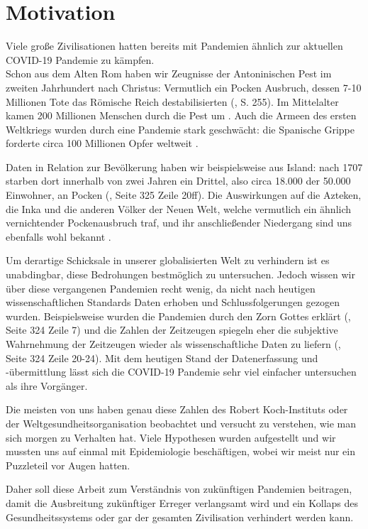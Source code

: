 \chapter{Motivation}\label{chap:Motivation}
Viele große Zivilisationen hatten bereits mit Pandemien ähnlich zur aktuellen COVID-19 Pandemie zu kämpfen.\\
Schon aus dem Alten Rom haben wir Zeugnisse der Antoninischen Pest im zweiten Jahrhundert nach Christus: Vermutlich ein Pocken Ausbruch, dessen 7-10 Millionen Tote das Römische Reich destabilisierten (\autocite{RomPest}, S. 255).
Im Mittelalter kamen 200 Millionen Menschen durch die Pest um \autocite{PestMittelalter}.
Auch die Armeen des ersten Weltkriegs wurden durch eine Pandemie stark geschwächt: die Spanische Grippe forderte circa 100 Millionen Opfer weltweit \autocite{SpanischeGrippe}.

Daten in Relation zur Bevölkerung haben wir beispielsweise aus Island: nach 1707 starben dort innerhalb von zwei Jahren ein Drittel, also circa  18.000 der 50.000 Einwohner, an Pocken (\autocite{americaPandemics}, Seite 325 Zeile 20ff). Die Auswirkungen auf die Azteken, die Inka und die anderen Völker der Neuen Welt, welche vermutlich ein ähnlich vernichtender Pockenausbruch traf, und ihr anschließender Niedergang sind uns ebenfalls wohl bekannt \autocite{americaPandemics}.

Um derartige Schicksale in unserer globalisierten Welt zu verhindern ist es unabdingbar, diese Bedrohungen bestmöglich zu untersuchen.
Jedoch wissen wir über diese vergangenen Pandemien recht wenig, da nicht nach heutigen wissenschaftlichen Standards Daten erhoben und Schlussfolgerungen gezogen wurden. Beispielsweise wurden die Pandemien durch den Zorn Gottes erklärt (\autocite{americaPandemics}, Seite 324 Zeile 7) und die Zahlen der Zeitzeugen spiegeln eher die subjektive Wahrnehmung der Zeitzeugen wieder als wissenschaftliche Daten zu liefern (\autocite{americaPandemics}, Seite 324 Zeile 20-24). Mit dem heutigen Stand der Datenerfassung und -übermittlung lässt sich die COVID-19 Pandemie sehr viel einfacher untersuchen als ihre Vorgänger.

Die meisten von uns haben genau diese Zahlen des Robert Koch-Instituts oder der Weltgesundheitsorganisation beobachtet und versucht zu verstehen, wie man sich morgen zu Verhalten hat. Viele Hypothesen wurden aufgestellt und wir mussten uns auf einmal mit Epidemiologie beschäftigen, wobei wir meist nur ein Puzzleteil vor Augen hatten.

Daher soll diese Arbeit zum Verständnis von zukünftigen Pandemien beitragen, damit die Ausbreitung zukünftiger Erreger verlangsamt wird und ein Kollaps des Gesundheitssystems oder gar der gesamten Zivilisation verhindert werden kann.